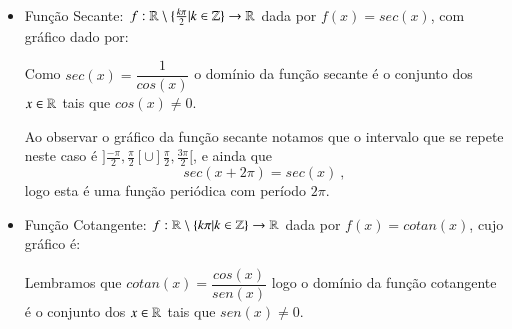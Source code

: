\begin{itemize}
  \item Função Secante: $f: \mathbb{R} \setminus \{\frac{k\pi}{2} | k \in \mathbb{Z}\} \rightarrow \mathbb{R}$ dada por $f(x)= sec(x)$, com gráfico dado por:

  
  Como $sec(x)= \dfrac{1}{cos (x)}$ o domínio da função secante é o conjunto dos $x \in \mathbb{R}$ tais que $cos(x) \neq 0$.
  
  Ao observar o gráfico da função secante notamos que o intervalo que se repete neste caso é $]\frac{-\pi}{2}, \frac{\pi}{2}[ \cup ] \frac{\pi}{2}, \frac{3\pi}{2}[$, e ainda que
  \[sec(x + 2\pi)= sec(x) \ ,\]
  logo esta é uma função periódica com período $2\pi$.

  \item Função Cotangente: $f: \mathbb{R} \setminus \{ k\pi | k \in \mathbb{Z}\} \rightarrow \mathbb{R}$ dada por $f(x)= cotan(x)$, cujo gráfico é:

  
  Lembramos que $cotan(x)= \dfrac{cos(x)}{sen(x)}$ logo o domínio da função cotangente é o conjunto dos $x \in \mathbb{R}$ tais que $sen(x) \neq 0$.
  

\end{itemize}

